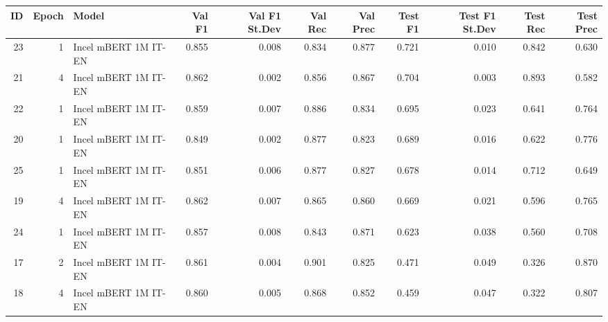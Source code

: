 \begin{tabular}{rrlrrrrrrrr}
\toprule
 ID &  Epoch &                Model &  Val F1 &  Val F1 St.Dev &  Val Rec &  Val Prec &  Test F1 &  Test F1 St.Dev &  Test Rec &  Test Prec \\
\midrule
 23 &      1 & Incel mBERT 1M IT-EN &   0.855 &          0.008 &    0.834 &     0.877 &    0.721 &           0.010 &     0.842 &      0.630 \\
 21 &      4 & Incel mBERT 1M IT-EN &   0.862 &          0.002 &    0.856 &     0.867 &    0.704 &           0.003 &     0.893 &      0.582 \\
 22 &      1 & Incel mBERT 1M IT-EN &   0.859 &          0.007 &    0.886 &     0.834 &    0.695 &           0.023 &     0.641 &      0.764 \\
 20 &      1 & Incel mBERT 1M IT-EN &   0.849 &          0.002 &    0.877 &     0.823 &    0.689 &           0.016 &     0.622 &      0.776 \\
 25 &      1 & Incel mBERT 1M IT-EN &   0.851 &          0.006 &    0.877 &     0.827 &    0.678 &           0.014 &     0.712 &      0.649 \\
 19 &      4 & Incel mBERT 1M IT-EN &   0.862 &          0.007 &    0.865 &     0.860 &    0.669 &           0.021 &     0.596 &      0.765 \\
 24 &      1 & Incel mBERT 1M IT-EN &   0.857 &          0.008 &    0.843 &     0.871 &    0.623 &           0.038 &     0.560 &      0.708 \\
 17 &      2 & Incel mBERT 1M IT-EN &   0.861 &          0.004 &    0.901 &     0.825 &    0.471 &           0.049 &     0.326 &      0.870 \\
 18 &      4 & Incel mBERT 1M IT-EN &   0.860 &          0.005 &    0.868 &     0.852 &    0.459 &           0.047 &     0.322 &      0.807 \\
\bottomrule
\end{tabular}
